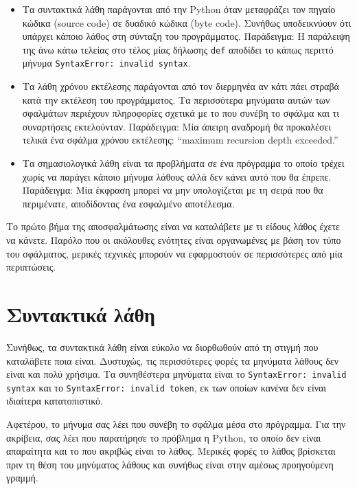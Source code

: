 \documentclass[10pt]{book}
\begin{document}
\begin{itemize}

\item  Τα συντακτικά λάθη παράγονται από την Python όταν μεταφράζει τον πηγαίο 
  κώδικα (source code) σε δυαδικό κώδικα (byte code).  Συνήθως υποδεικνύουν ότι υπάρχει
  κάποιο λάθος στη σύνταξη του προγράμματος.  Παράδειγμα:  Η παράλειψη της άνω κάτω τελείας 
  στο τέλος μίας δήλωσης {\tt def} αποδίδει το κάπως περιττό μήνυμα  
  {\tt SyntaxError: invalid syntax}.

\item  Τα λάθη χρόνου εκτέλεσης παράγονται από τον διερμηνέα αν κάτι πάει στραβά κατά την 
  εκτέλεση του προγράμματος.  Τα περισσότερα μηνύματα αυτών των σφαλμάτων περιέχουν 
  πληροφορίες σχετικά με το που συνέβη το σφάλμα και τι συναρτήσεις εκτελούνταν. 
  Παράδειγμα: Μία άπειρη αναδρομή θα προκαλέσει τελικά ένα σφάλμα χρόνου εκτέλεσης: 
   ``maximum recursion depth exceeded.''

\item  Τα σημασιολογικά λάθη είναι τα προβλήματα σε ένα πρόγραμμα το οποίο τρέχει 
  χωρίς να παράγει κάποιο μήνυμα λάθους αλλά δεν κάνει αυτό που θα έπρεπε.  Παράδειγμα: 
   Μία έκφραση μπορεί να μην υπολογίζεται με τη σειρά που θα περιμένατε, αποδίδοντας 
  ένα εσφαλμένο αποτέλεσμα. 

\end{itemize}

Το πρώτο βήμα της αποσφαλμάτωσης είναι να καταλάβετε με τι είδους λάθος έχετε να κάνετε.  
Παρόλο που οι ακόλουθες ενότητες είναι οργανωμένες με βάση τον τύπο του σφάλματος, μερικές τεχνικές
μπορούν να εφαρμοστούν σε περισσότερες από μία περιπτώσεις.


\section{Συντακτικά λάθη}

Συνήθως, τα συντακτικά λάθη είναι εύκολο να διορθωθούν από τη στιγμή που καταλάβετε ποια 
είναι.  Δυστυχώς, τις περισσότερες φορές τα μηνύματα λάθους δεν είναι και πολύ χρήσιμα. 
Τα συνηθέστερα μηνύματα είναι το {\tt SyntaxError: invalid syntax} και το {\tt SyntaxError: invalid token},
εκ των οποίων κανένα δεν είναι ιδιαίτερα κατατοπιστικό. 

Αφετέρου, το μήνυμα σας λέει που συνέβη το σφάλμα μέσα στο πρόγραμμα.  Για την ακρίβεια, σας 
λέει που παρατήρησε το πρόβλημα η Python, το οποίο δεν είναι απαραίτητα και το που ακριβώς είναι
το λάθος.  Μερικές φορές το λάθος βρίσκεται πριν τη θέση του μηνύματος λάθους και συνήθως είναι
στην αμέσως προηγούμενη γραμμή.
\end{document}
